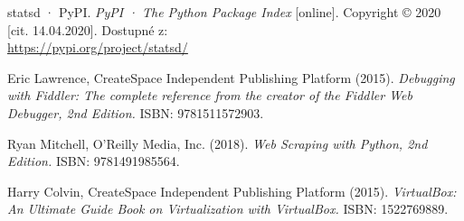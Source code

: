 \documentclass[thesis=M,czech,hidelinks]{FITthesis}[2013/05/06]
\begin{document}
\begin{thebibliography}{9}
	
	statsd · PyPI. \textit{PyPI · The Python Package Index} [online]. Copyright © 2020 [cit. 14.04.2020]. Dostupné z: \\
	\url{https://pypi.org/project/statsd/}
	
	Eric Lawrence, CreateSpace Independent Publishing Platform (2015).\textit{ Debugging with
	Fiddler: The complete reference from the creator of the Fiddler Web Debugger, 2nd
	Edition.} ISBN: 9781511572903.
	
	Ryan Mitchell, O'Reilly Media, Inc. (2018). \textit{Web Scraping with Python, 2nd Edition.}
	ISBN: 9781491985564.
	
	Harry Colvin, CreateSpace Independent Publishing Platform (2015). \textit{VirtualBox: An
	Ultimate Guide Book on Virtualization with VirtualBox.} ISBN: 1522769889.
		
\end{thebibliography}

\appendix



\end{document}
